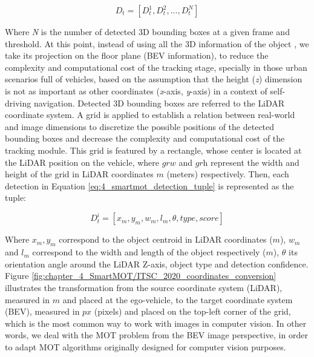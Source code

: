 \begin{equation}
	\label{eq:4_smartmot_detection}
	D_{t} =[D_{t}^{1},D_{t}^{2}, ...,D_{t}^{N}]
\end{equation}

Where \textit{N} is the number of detected 3D bounding boxes at a given frame and threshold. At this point, instead of using all the 3D information of the object \cite{chiu2021probabilistic, weng20203d}, we take its projection on the floor plane (\ac{BEV} information), to reduce the complexity and computational cost of the tracking stage, specially in those urban scenarios full of vehicles, based on the assumption that the height (\textit{z}) dimension is not as important as other coordinates (\textit{x}-axis, \textit{y}-axis) in a context of self-driving navigation. Detected 3D bounding boxes are referred to the \ac{LiDAR} coordinate system. A grid is applied to establish a relation between real-world and image dimensions to discretize the possible positions of the detected bounding boxes and decrease the complexity and computational cost of the tracking module. This grid is featured by a rectangle, whose center is located at the \ac{LiDAR} position on the vehicle, where $\textit{grw}$ and $\textit{grh}$ represent the width and height of the grid in \ac{LiDAR} coordinates $\textit{m}$ (meters) respectively. Then, each detection in Equation \ref{eq:4_smartmot_detection_tuple} is represented as the tuple:

\begin{equation}
	\label{eq:4_smartmot_detection_tuple}
	D_{t}^{i} = [x_{m},y_{m},w_{m},l_{m},\theta,type,score]
\end{equation}

Where $\textit{$x_{m},y_{m}$}$ correspond to the object centroid in \ac{LiDAR} coordinates ($\textit{m}$), $\textit{$w_{m}$}$ and $\textit{$l_{m}$}$ correspond to the width and length of the object respectively ($\textit{m}$), $\theta$ its orientation angle around the \ac{LiDAR} Z-axis, object type and detection confidence. Figure \ref{fig:chapter_4_SmartMOT/ITSC_2020_coordinates_conversion} illustrates the transformation from the source coordinate system (\ac{LiDAR}), measured in $\textit{m}$ and placed at the ego-vehicle, to the target coordinate system (\ac{BEV}), measured in $\textit{px}$ (pixels) and placed on the top-left corner of the grid, which is the most common way to work with images in computer vision. In other words, we deal with the \ac{MOT} problem from the \ac{BEV} image perspective, in order to adapt \ac{MOT} algorithms originally designed for computer vision purposes. 

